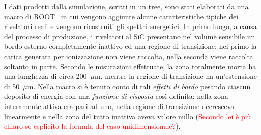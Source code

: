I dati prodotti dalla simulazione, scritti in un tree, sono stati elaborati da una macro di ROOT~\cite{brun:nima97} in cui vengono aggiunte alcune caratteristiche tipiche dei rivelatori reali e vengono ricostruiti gli spettri energetici.
%
In primo luogo, a causa del processo di produzione, i rivelatori al SiC presentano nel volume sensibile un bordo esterno completamente inattivo ed una regione di transizione: nel primo la carica generata per ionizzazione non viene raccolta, nella seconda viene raccolta soltanto in parte.
Secondo le misurazioni effettuate, la zona totalmente morta ha una lunghezza di circa 200~$\mu$m, mentre la regione di transizione ha un'estensione di 50~$\mu$m. 
%
Nella macro si è tenuto conto di tali \emph{effetti di bordo} pesando ciascun deposito di energia con una \emph{funzione di risposta} così definita: nella zona interamente attiva era pari ad uno, nella regione di transizione decresceva linearmente e nella zona del tutto inattiva aveva valore nullo (\textcolor{red}{Secondo lei è più chiaro se esplicito la formula del caso unidimensionale?}).

